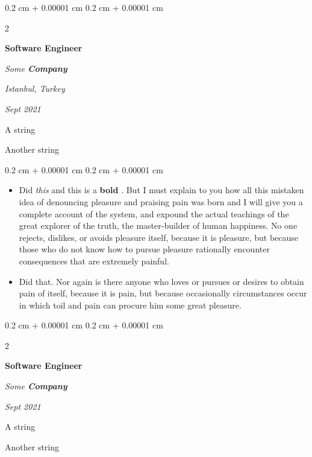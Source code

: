 \documentclass[10pt, letterpaper]{article}
\newenvironment{summary}{
    \begin{description}[
        topsep=0.10 cm,
        parsep=0.10 cm,
        partopsep=0pt,
        itemsep=0pt,
        leftmargin=0.4 cm + 10pt
    ]
}{
    \end{description}
} %
\newenvironment{highlights}{
    \begin{itemize}[
        topsep=0.10 cm,
        parsep=0.10 cm,
        partopsep=0pt,
        itemsep=0pt,
        leftmargin=0.4 cm + 10pt
    ]
}{
    \end{itemize}
} %
\newenvironment{onecolentry}{
    \begin{adjustwidth}{
        0.2 cm + 0.00001 cm
    }{
        0.2 cm + 0.00001 cm
    }
}{
    \end{adjustwidth}
} %
\newenvironment{twocolentry}[2][]{
    \onecolentry
    \def\secondColumn{#2}
    \setcolumnwidth{\fill, 4.5 cm}
    \begin{paracol}{2}
}{
    \switchcolumn \raggedleft \secondColumn
    \end{paracol}
    \endonecolentry
} %
\let\hrefWithoutArrow\href
\renewcommand{\href}[2]{\hrefWithoutArrow{#1}{\ifthenelse{\equal{#2}{}}{ }{#2 }\raisebox{.15ex}{\footnotesize \faExternalLink*}}}
\begin{document}
        \begin{twocolentry}{
        \textit{Istanbul, Turkey}    
            
        \textit{Sept 2021}}
            \textbf{Software Engineer}
            
            \textit{Some \textbf{Company}}
        \end{twocolentry}
            \begin{summary}
                \item A string
                \item Another string
            \end{summary}
        \vspace{0.10 cm}
        \begin{onecolentry}
            \begin{highlights}
                \item Did \textit{this} and this is a \textbf{bold} \href{https://example.com}{link}. But I must explain to you how all this mistaken idea of denouncing pleasure and praising pain was born and I will give you a complete account of the system, and expound the actual teachings of the great explorer of the truth, the master-builder of human happiness. No one rejects, dislikes, or avoids pleasure itself, because it is pleasure, but because those who do not know how to pursue pleasure rationally encounter consequences that are extremely painful.
                \item Did that. Nor again is there anyone who loves or pursues or desires to obtain pain of itself, because it is pain, but because occasionally circumstances occur in which toil and pain can procure him some great pleasure.
            \end{highlights}
        \end{onecolentry}


        \vspace{0.2 cm}

        \begin{twocolentry}{
            
            
        \textit{Sept 2021}}
            \textbf{Software Engineer}
            
            \textit{Some \textbf{Company}}
        \end{twocolentry}
            \begin{summary}
                \item A string
                \item Another string
            \end{summary}
\end{document}
